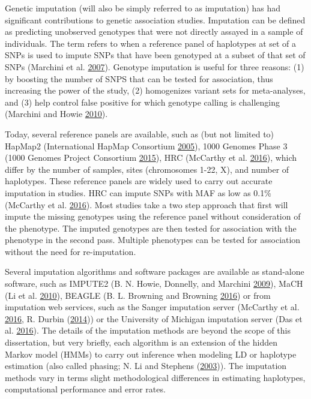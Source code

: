 \documentclass[]{DissertateOSU}
\begin{document}
Genetic imputation (will also be simply referred to as imputation) has
had significant contributions to genetic association studies. Imputation
can be defined as predicting unobserved genotypes that were not directly
assayed in a sample of individuals. The term refers to when a reference
panel of haplotypes at set of a SNPs is used to impute SNPs that have
been genotyped at a subset of that set of SNPs (Marchini et al.
\protect\hyperlink{ref-snptest}{2007}). Genotype imputation is useful
for three reasons: (1) by boosting the number of SNPS that can be tested
for association, thus increasing the power of the study, (2) homogenizes
variant sets for meta-analyses, and (3) help control false positive for
which genotype calling is challenging (Marchini and Howie
\protect\hyperlink{ref-marchini_impute}{2010}).

Today, several reference panels are available, such as (but not limited
to) HapMap2 (International HapMap Consortium
\protect\hyperlink{ref-hapmap_2005}{2005}), 1000 Genomes Phase 3 (1000
Genomes Project Consortium \protect\hyperlink{ref-1000genomes}{2015}),
HRC (McCarthy et al. \protect\hyperlink{ref-hrc}{2016}), which differ by
the number of samples, sites (chromosomes 1-22, X), and number of
haplotypes. These reference panels are widely used to carry out accurate
imputation in studies. HRC can impute SNPs with MAF as low as 0.1\%
(McCarthy et al. \protect\hyperlink{ref-hrc}{2016}). Most studies take a
two step approach that first will impute the missing genotypes using the
reference panel without consideration of the phenotype. The imputed
genotypes are then tested for association with the phenotype in the
second pass. Multiple phenotypes can be tested for association without
the need for re-imputation.

Several imputation algorithms and software packages are available as
stand-alone software, such as IMPUTE2 (B. N. Howie, Donnelly, and
Marchini \protect\hyperlink{ref-Howie_2009}{2009}), MaCH (Li et al.
\protect\hyperlink{ref-mach_2010}{2010}), BEAGLE (B. L. Browning and
Browning \protect\hyperlink{ref-browning_2016}{2016}) or from imputation
web services, such as the Sanger imputation server (McCarthy et al.
\protect\hyperlink{ref-hrc}{2016}, R. Durbin
(\protect\hyperlink{ref-durbin_2014}{2014})) or the University of
Michigan imputation server (Das et al.
\protect\hyperlink{ref-michigan_imputation}{2016}). The details of the
imputation methods are beyond the scope of this dissertation, but very
briefly, each algorithm is an extension of the hidden Markov model
(HMMs) to carry out inference when modeling LD or haplotype estimation
(also called phasing; N. Li and Stephens
(\protect\hyperlink{ref-li_2003}{2003})). The imputation methods vary in
terms slight methodological differences in estimating haplotypes,
computational performance and error rates.
\end{document}
